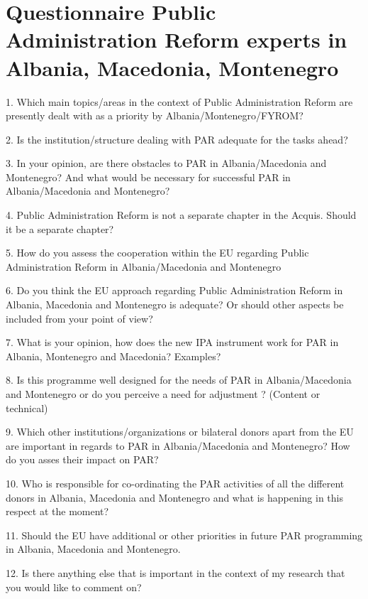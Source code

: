 \chapter{Questionnaire Public Administration Reform experts in Albania, Macedonia, Montenegro}
\label{anhang:Questionnaire Public Administration Reform experts}
1. Which main topics/areas in the context of Public Administration Reform are presently dealt with as a priority by Albania/Montenegro/FYROM?

2. Is the institution/structure dealing with PAR adequate for the tasks ahead? 

3. In your opinion, are there obstacles to PAR in Albania/Macedonia and Montenegro? And what would be necessary for successful PAR in Albania/Macedonia and Montenegro? 

4. Public Administration Reform is not a separate chapter in the Acquis. Should it be a separate chapter? 

5. How do you assess the cooperation within the EU regarding Public Administration Reform in Albania/Macedonia and Montenegro 

6. Do you think the EU approach regarding Public Administration Reform in Albania, Macedonia and Montenegro is adequate? Or should other aspects be included from your point of view?

7. What is your opinion, how does the new IPA instrument work for PAR in Albania, Montenegro and Macedonia? Examples?

8. Is this programme well designed for the needs of PAR in Albania/Macedonia and Montenegro or do you perceive a need for adjustment ? (Content or technical)

9. Which other institutions/organizations or bilateral donors apart from the EU are important in regards to PAR in Albania/Macedonia and Montenegro? How do you asses their impact on PAR? 

10. Who is responsible for co-ordinating the PAR activities of all the different donors in Albania, Macedonia and Montenegro and what is happening in this respect at the moment? 

11. Should the EU have additional or other priorities in future PAR programming in Albania, Macedonia and Montenegro. 

12. Is there anything else that is important in the context of my research that you would like to comment on?